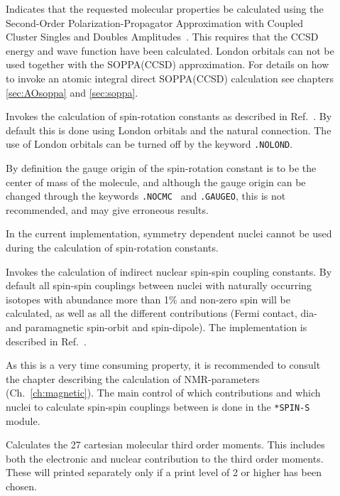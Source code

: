 \begin{description}
\item[] Indicates that the requested molecular properties
be calculated using the Second-Order Polarization-Propagator
Approximation with Coupled Cluster Singles and Doubles
Amplitudes~\cite{soppaccsd,tejospastcan100,ekdspasjpca102,ctocd}.
This requires that the CCSD energy and wave function have been
calculated. London orbitals can not be used together with the
SOPPA(CCSD) approximation. For details on how to invoke an atomic
integral direct SOPPA(CCSD) calculation \cite{spas037, spas089} see
chapters \ref{sec:AOsoppa}
 and \ref{sec:soppa}.

\item[] Invokes the calculation of
spin-rotation
constants as described in Ref.~\cite{jgkrthjcp105}. By default this is
done using London orbitals  and the
natural connection. The use of London
orbitals can be turned off by the keyword \verb|.NOLOND|.

By definition the gauge origin of the
spin-rotation constant is to be the
center of mass of the molecule, and although the
gauge origin can be
changed through the keywords \verb|.NOCMC | and \verb|.GAUGEO|, this
is not recommended, and may give erroneous results.

In the current implementation, symmetry dependent nuclei cannot be
used during the calculation of spin-rotation constants.

\item[] Invokes the calculation of indirect nuclear
spin-spin coupling constants. By default all
spin-spin couplings
between nuclei with naturally occurring isotopes with abundance more
than 1\% and non-zero spin will be calculated, as well as all the different
contributions (Fermi contact, dia- and paramagnetic spin-orbit and
spin-dipole). The implementation is described in
Ref.~\cite{ovhapjhjajsbpthjcp96}.

As this is a very time consuming property, it is recommended to
consult the chapter describing the calculation of NMR-parameters
(Ch.~\ref{ch:magnetic}). The main control of which
contributions and which nuclei to calculate spin-spin couplings
between is done in the \verb|*SPIN-S| module.

\item[] Calculates the 27 cartesian molecular third order
moments.
This includes both the electronic and nuclear contribution to the
third order moments. These will printed separately only if a print
level of 2 or higher has been chosen.


\end{description}
